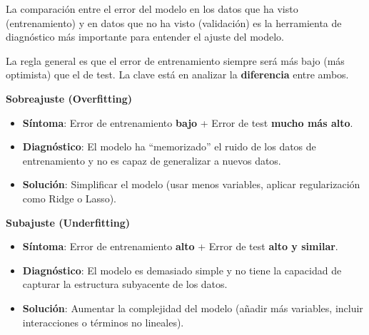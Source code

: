 \documentclass[
  letterpaper,
  DIV=11,
  numbers=noendperiod]{scrreprt}
\providecommand{\tightlist}{%
  \setlength{\itemsep}{0pt}\setlength{\parskip}{0pt}}
\begin{document}
\begin{tcolorbox}[enhanced jigsaw, breakable, toprule=.15mm, bottomtitle=1mm, coltitle=black, colbacktitle=quarto-callout-important-color!10!white, titlerule=0mm, opacitybacktitle=0.6, bottomrule=.15mm, toptitle=1mm, title=\textcolor{quarto-callout-important-color}{\faExclamation}\hspace{0.5em}{Interpretando el Error}, arc=.35mm, rightrule=.15mm, opacityback=0, colframe=quarto-callout-important-color-frame, leftrule=.75mm, left=2mm, colback=white]

La comparación entre el error del modelo en los datos que ha visto
(entrenamiento) y en datos que no ha visto (validación) es la
herramienta de diagnóstico más importante para entender el ajuste del
modelo.

La regla general es que el error de entrenamiento siempre será más bajo
(más optimista) que el de test. La clave está en analizar la
\textbf{diferencia} entre ambos.

\textbf{Sobreajuste (Overfitting)}

\begin{itemize}
\tightlist
\item
  \textbf{Síntoma}: Error de entrenamiento \textbf{bajo} + Error de test
  \textbf{mucho más alto}.
\item
  \textbf{Diagnóstico}: El modelo ha ``memorizado'' el ruido de los
  datos de entrenamiento y no es capaz de generalizar a nuevos datos.
\item
  \textbf{Solución}: Simplificar el modelo (usar menos variables,
  aplicar regularización como Ridge o Lasso).
\end{itemize}

\textbf{Subajuste (Underfitting)}

\begin{itemize}
\tightlist
\item
  \textbf{Síntoma}: Error de entrenamiento \textbf{alto} + Error de test
  \textbf{alto y similar}.
\item
  \textbf{Diagnóstico}: El modelo es demasiado simple y no tiene la
  capacidad de capturar la estructura subyacente de los datos.
\item
  \textbf{Solución}: Aumentar la complejidad del modelo (añadir más
  variables, incluir interacciones o términos no lineales).
\end{itemize}

\end{tcolorbox}
\end{document}
